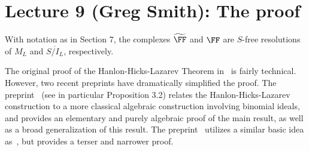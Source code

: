\documentclass{amsart}
\begin{document}
\section{Lecture 9 (Greg Smith): The proof}\label{lec:9-HHL-proof}

\begin{theorem} \cite{HHL}\label{thm:HHL-resolution}
With notation as in Section 7, the complexes $\tF$ and $\FF$ are $S$-free resolutions of $M_{L}$ and $\overline{S/I_{L}}$, respectively. 
\end{theorem}

The original proof of the Hanlon-Hicks-Lazarev Theorem in~\cite{HHL} is fairly technical.  However, two recent preprints have dramatically simplified the proof.  The preprint~\cite{BCHSY} (see in particular Proposition 3.2) relates the Hanlon-Hicks-Lazarev construction to a more classical algebraic construction involving binomial ideals, and provides an elementary and purely algebraic proof of the main result, as well as a broad generalization of this result.  The preprint~\cite{BH25} utilizes a similar basic idea as~\cite{BCHSY}, but provides a terser and narrower proof.
\end{document}
